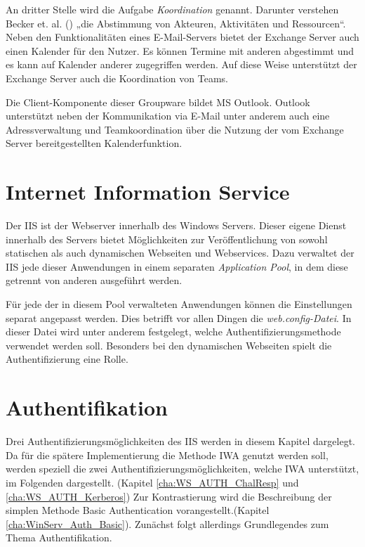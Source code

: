 An dritter Stelle wird die Aufgabe \emph{Koordination} genannt. Darunter verstehen Becker et. al. (\citeyear[S. 3]{Becker.2014}) „die Abstimmung von Akteuren, Aktivitäten und Ressourcen“. Neben den Funktionalitäten eines E-Mail-Servers bietet der Exchange Server auch einen Kalender für den Nutzer. Es können Termine mit anderen abgestimmt und es kann auf Kalender anderer zugegriffen werden. \cite[S. 485-486]{Joos.2010} Auf diese Weise unterstützt der Exchange Server auch die Koordination von Teams.

Die Client-Komponente dieser Groupware bildet \ac{MS} Outlook. \cite[S. 590]{Joos.2010} Outlook unterstützt neben der Kommunikation via E-Mail unter anderem auch eine Adressverwaltung und Teamkoordination über die Nutzung der vom Exchange Server bereitgestellten Kalenderfunktion. \cite[S. 589]{Joos.2010}

\section{Internet Information Service}

Der \ac{IIS} ist der Webserver innerhalb des Windows Servers. \cite[S. 909]{Boddenberg.2014} Dieser eigene Dienst innerhalb des Servers bietet Möglichkeiten zur Veröffentlichung von sowohl statischen als auch dynamischen Webseiten und Webservices. Dazu verwaltet der \ac{IIS} jede dieser Anwendungen in einem separaten \emph{Application Pool}, in dem diese getrennt von anderen ausgeführt werden. \cite[S. 75-76]{Hockmann.2008}

Für jede der in diesem Pool verwalteten Anwendungen können die Einstellungen separat angepasst werden. Dies betrifft vor allen Dingen die \emph{web.config-Datei}. \cite[S. 919, 921]{Joos.2010} In dieser Datei wird unter anderem festgelegt, welche Authentifizierungsmethode verwendet werden soll. \cite[S. 13]{Bradley.2003} Besonders bei den dynamischen Webseiten spielt die Authentifizierung eine Rolle. \cite[S. 909]{Boddenberg.2014}

\section{Authentifikation}
\label{cha:WinServ_Auth}
Drei Authentifizierungsmöglichkeiten des \ac{IIS} werden in diesem Kapitel dargelegt. Da für die spätere Implementierung die Methode \ac{IWA} genutzt werden soll, werden speziell die zwei Authentifizierungsmöglichkeiten, welche \ac{IWA} unterstützt, im Folgenden dargestellt. (Kapitel \ref{cha:WS_AUTH_ChalResp} und \ref{cha:WS_AUTH_Kerberos}) Zur Kontrastierung wird die Beschreibung der simplen Methode Basic Authentication vorangestellt.(Kapitel \ref{cha:WinServ_Auth_Basic}). Zunächst folgt allerdings Grundlegendes zum Thema Authentifikation.


